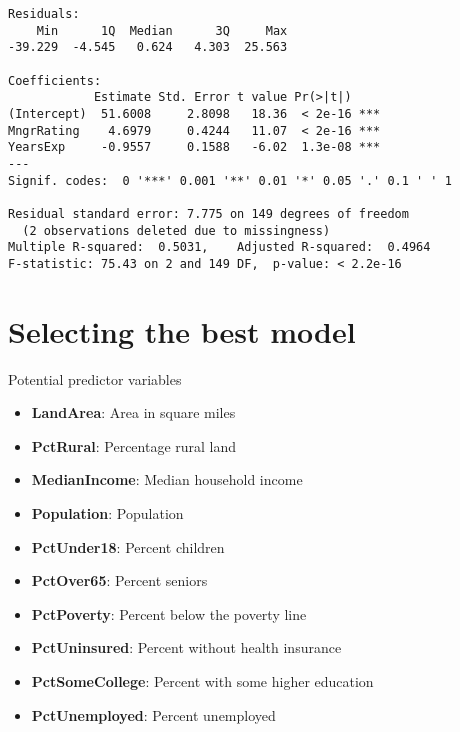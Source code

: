 \documentclass{beamer}\usepackage[]{graphicx}\usepackage[]{color}
\makeatletter
\newenvironment{kframe}{%
 \def\at@end@of@kframe{}%
 \ifinner\ifhmode%
  \def\at@end@of@kframe{\end{minipage}}%
  \begin{minipage}{\columnwidth}%
 \fi\fi%
 \def\FrameCommand##1{\hskip\@totalleftmargin \hskip-\fboxsep
 \colorbox{shadecolor}{##1}\hskip-\fboxsep
     \hskip-\linewidth \hskip-\@totalleftmargin \hskip\columnwidth}%
 \MakeFramed {\advance\hsize-\width
   \@totalleftmargin\z@ \linewidth\hsize
   \@setminipage}}%
 {\par\unskip\endMakeFramed%
 \at@end@of@kframe}
\newenvironment{knitrout}{}{} %
\makeatother
\begin{document}
\begin{darkframes}
\begin{frame}[fragile]
\begin{knitrout}
\begin{kframe}
\begin{verbatim}
Residuals:
    Min      1Q  Median      3Q     Max 
-39.229  -4.545   0.624   4.303  25.563 

Coefficients:
            Estimate Std. Error t value Pr(>|t|)    
(Intercept)  51.6008     2.8098   18.36  < 2e-16 ***
MngrRating    4.6979     0.4244   11.07  < 2e-16 ***
YearsExp     -0.9557     0.1588   -6.02  1.3e-08 ***
---
Signif. codes:  0 '***' 0.001 '**' 0.01 '*' 0.05 '.' 0.1 ' ' 1

Residual standard error: 7.775 on 149 degrees of freedom
  (2 observations deleted due to missingness)
Multiple R-squared:  0.5031,	Adjusted R-squared:  0.4964 
F-statistic: 75.43 on 2 and 149 DF,  p-value: < 2.2e-16
\end{verbatim}
\end{kframe}
\end{knitrout}
    \end{frame}

    \section{Selecting the best model}
    \begin{frame}
    \end{frame}

    \begin{frame}[fragile]{Potential predictor variables}
      \begin{itemize}
        \item \textbf{LandArea}:       Area in square miles
        \item \textbf{PctRural}:       Percentage rural land
        \item \textbf{MedianIncome}:   Median household income
        \item \textbf{Population}:     Population
        \item \textbf{PctUnder18}:     Percent children
        \item \textbf{PctOver65}:      Percent seniors
        \item \textbf{PctPoverty}:     Percent below the poverty line
        \item \textbf{PctUninsured}:   Percent without health insurance
        \item \textbf{PctSomeCollege}: Percent with some higher education
        \item \textbf{PctUnemployed}:  Percent unemployed
      \end{itemize}
    \end{frame}


\end{darkframes}
\end{document}
